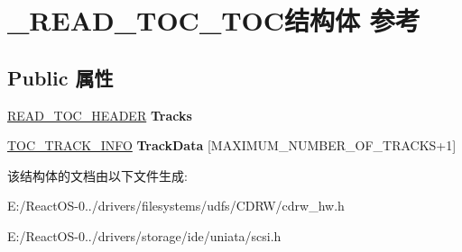 \hypertarget{struct___r_e_a_d___t_o_c___t_o_c}{}\section{\+\_\+\+R\+E\+A\+D\+\_\+\+T\+O\+C\+\_\+\+T\+O\+C结构体 参考}
\label{struct___r_e_a_d___t_o_c___t_o_c}
\subsection*{Public 属性}
\begin{DoxyCompactItemize}
\item 
\mbox{\label{struct___r_e_a_d___t_o_c___t_o_c_afdef75a1949575edb0ac7289463a9eb5}} 
\hyperlink{struct___r_e_a_d___t_o_c___h_e_a_d_e_r}{R\+E\+A\+D\+\_\+\+T\+O\+C\+\_\+\+H\+E\+A\+D\+ER} {\bfseries Tracks}
\item 
\mbox{\label{struct___r_e_a_d___t_o_c___t_o_c_a7cc4cb2e81a18abd97b25b5a16120bdc}} 
\hyperlink{struct___t_o_c___t_r_a_c_k___i_n_f_o}{T\+O\+C\+\_\+\+T\+R\+A\+C\+K\+\_\+\+I\+N\+FO} {\bfseries Track\+Data} \mbox{[}M\+A\+X\+I\+M\+U\+M\+\_\+\+N\+U\+M\+B\+E\+R\+\_\+\+O\+F\+\_\+\+T\+R\+A\+C\+KS+1\mbox{]}
\end{DoxyCompactItemize}


该结构体的文档由以下文件生成\+:\begin{DoxyCompactItemize}
\item 
E\+:/\+React\+O\+S-\/0../drivers/filesystems/udfs/\+C\+D\+R\+W/cdrw\+\_\+hw.\+h\item 
E\+:/\+React\+O\+S-\/0../drivers/storage/ide/uniata/scsi.\+h\end{DoxyCompactItemize}
